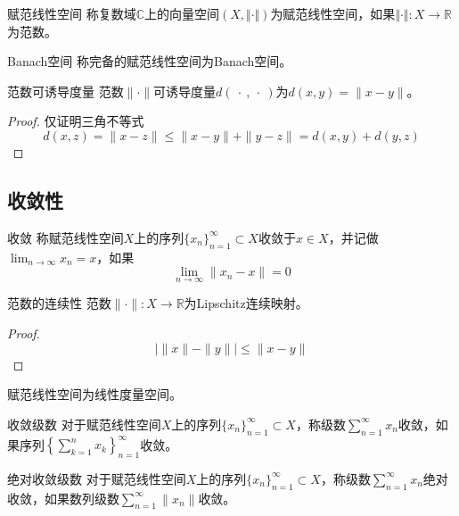\documentclass[lang = cn, scheme = chinese, thmcnt = section]{elegantbook}
\newcommand{\R}{\mathbb{R}}            %
\newcommand{\sub}{\subset}             %
\begin{document}
\begin{definition}{赋范线性空间}
	称复数域$\mathbb{C}$上的向量空间$(X,\Vert \cdot \Vert)$为赋范线性空间，如果$\Vert \cdot \Vert:X\to\mathbb{R}$为范数。
\end{definition}

\begin{definition}{Banach空间}
	称完备的赋范线性空间为Banach空间。
\end{definition}

\begin{theorem}{范数可诱导度量}
	范数$\|\cdot\|$可诱导度量$d(\:\cdot\:,\:\cdot\:)$为$d(x,y)=\|x-y\|$。
\end{theorem}

\begin{proof}
	仅证明三角不等式
	\[ 
	d(x,z)
	=\|x-z\|
	\le \|x-y\|+\|y-z\|
	=d(x,y)+d(y,z)
	 \]
\end{proof}

\subsection{收敛性}

\begin{definition}{收敛}
	称赋范线性空间$X$上的序列$\{x_n\}_{n=1}^{\infty}\sub X$收敛于$x\in X$，并记做$\displaystyle\lim_{n\to\infty}x_n=x$，如果
	$$
	\lim_{n\to\infty}\|x_n-x\|=0
	$$
\end{definition}

\begin{theorem}{范数的连续性}
	范数$\| \cdot\|:X\to\R$为Lipschitz连续映射。
\end{theorem}

\begin{proof}
	$$
	|\|x\|-\|y\||\le \|x-y\|
	$$
\end{proof}

\begin{corollary}
	赋范线性空间为线性度量空间。
\end{corollary}

\begin{definition}{收敛级数}
	对于赋范线性空间$X$上的序列$\{x_n\}_{n=1}^{\infty}\sub X$，称级数$\displaystyle\sum_{n=1}^{\infty}x_n$收敛，如果序列$\displaystyle\left\{\sum_{k=1}^{n}x_k\right\}_{n=1}^{\infty}$收敛。
\end{definition}

\begin{definition}{绝对收敛级数}
	对于赋范线性空间$X$上的序列$\{x_n\}_{n=1}^{\infty}\sub X$，称级数$\displaystyle\sum_{n=1}^{\infty}x_n$绝对收敛，如果数列级数$\displaystyle\sum_{n=1}^{\infty}\|x_n\|$收敛。
\end{definition}
\end{document}
